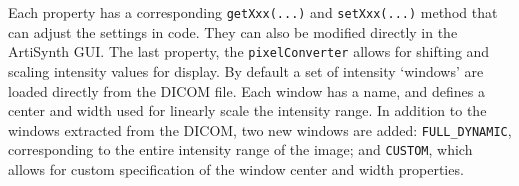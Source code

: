 
Each property has a corresponding \lstinline{getXxx(...)} and \lstinline{setXxx(...)} method that can
adjust the settings in code.  They can also be modified directly in the ArtiSynth GUI.  The
last property, the \lstinline{pixelConverter} allows for shifting and scaling intensity values for display.  
By default a set of intensity `windows' are loaded directly from the DICOM file.
Each window has a name, and defines a center and width used for linearly scale the intensity range.  
In addition to the windows extracted from the DICOM, two new windows are added: 
\texttt{FULL\_DYNAMIC}, corresponding to the entire intensity range of the image; and \texttt{CUSTOM},
which allows for custom specification of the window center and width properties.

